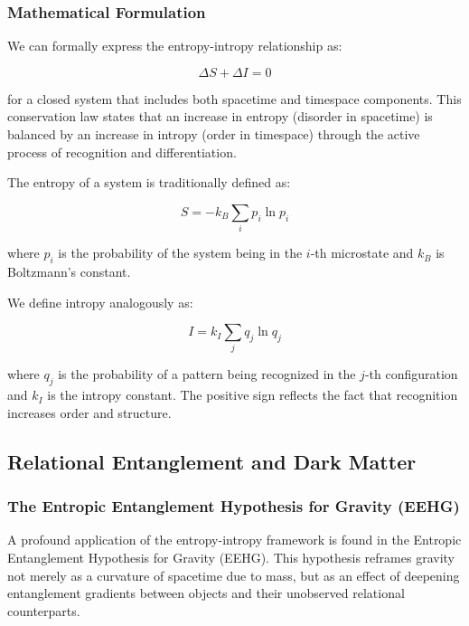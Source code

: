\documentclass{article}
\begin{document}
\subsubsection{Mathematical Formulation}

We can formally express the entropy-intropy relationship as:

\begin{equation}
\Delta S + \Delta I = 0
\end{equation}

for a closed system that includes both spacetime and timespace components. This conservation law states that an increase in entropy (disorder in spacetime) is balanced by an increase in intropy (order in timespace) through the active process of recognition and differentiation.

The entropy of a system is traditionally defined as:

\begin{equation}
S = -k_B \sum_i p_i \ln p_i
\end{equation}

where $p_i$ is the probability of the system being in the $i$-th microstate and $k_B$ is Boltzmann's constant.

We define intropy analogously as:

\begin{equation}
I = k_I \sum_j q_j \ln q_j
\end{equation}

where $q_j$ is the probability of a pattern being recognized in the $j$-th configuration and $k_I$ is the intropy constant. The positive sign reflects the fact that recognition increases order and structure.

\subsection{Relational Entanglement and Dark Matter}

\subsubsection{The Entropic Entanglement Hypothesis for Gravity (EEHG)}

A profound application of the entropy-intropy framework is found in the Entropic Entanglement Hypothesis for Gravity (EEHG). This hypothesis reframes gravity not merely as a curvature of spacetime due to mass, but as an effect of deepening entanglement gradients between objects and their unobserved relational counterparts.
\end{document}
